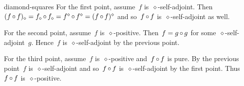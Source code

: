 \begin{solution}{diamond-squares}%
For the first point, assume~$f$ is~$\diamond$-self-adjoint.
Then~$(f \mathop{\circ} f)_\diamond
        = f_\diamond \mathop{\circ} f_\diamond
        = f^\diamond \mathop{\circ} f^\diamond
        = (f \mathop{\circ} f)^\diamond $
        and so~$f\mathop{\circ} f$ is~$\diamond$-self-adjoint as well.

For the second point, assume~$f$ is~$\diamond$-positive.
Then~$f = g \mathop{\circ} g$ for some~$\diamond$-self-adjoint~$g$.
Hence~$f$ is~$\diamond$-self-adjoint by the previous point.

For the third point, assume~$f$ is~$\diamond$-positive
    and~$f \mathop{\circ} f$ is pure.
By the previous point~$f$ is~$\diamond$-self-adjoint
        and so~$f\mathop{\circ} f$ is~$\diamond$-self-adjoint by the first point.
    Thus~$f \mathop{\circ} f$ is~$\diamond$-positive.
\end{solution}


